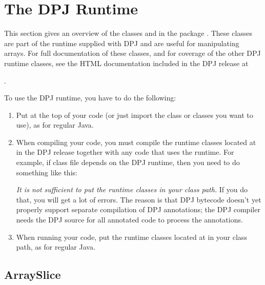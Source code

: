 \section{The DPJ Runtime%
\label{sec:runtime}}

This section gives an overview of the classes  and
 in the package .  These classes are
part of the runtime supplied with DPJ and are useful for manipulating
arrays.  For full documentation of these classes, and for coverage of
the other DPJ runtime classes, see the HTML documentation included in
the DPJ release at 
%
\begin{description}
\item {}.
\end{description}

To use the DPJ runtime, you have to do the following:
%
\begin{enumerate}
%
\item Put  at the top of your code (or just
  import the class or classes you want to use), as for regular Java.
%
\item When compiling your code, you must compile the runtime classes
  located at  in the DPJ release
  together with any code that uses the runtime.  For example, if class
  file  depends on the DPJ runtime, then you need to do
  something like this:
%
%
\emph{It is not sufficient to put the runtime classes in your class
  path.}  If you do that, you will get a lot of errors.  The reason is
that DPJ bytecode doesn't yet properly support separate compilation of
DPJ annotations; the DPJ compiler needs the DPJ source for all
annotated code to process the annotations.
%
\item When running your code, put the runtime classes located at
   in your class path, as for
  regular Java.
%
\end{enumerate}

\subsection{ArraySlice%
\label{sec:runtime:array}}

